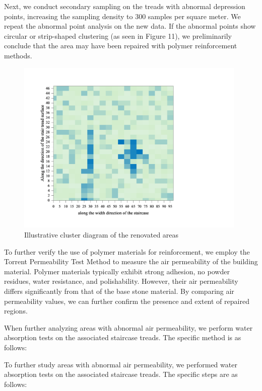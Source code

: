 \documentclass{mcmthesis}
\begin{document}
Next, we conduct secondary sampling on the treads with abnormal depression points, increasing the sampling density to 300 samples per square meter. We repeat the abnormal point analysis on the new data. If the abnormal points show circular or strip-shaped clustering (as seen in Figure 11), we preliminarily conclude that the area may have been repaired with polymer reinforcement methods.
\begin{figure}[h]  %
  \small
  \centering  %
  \includegraphics[width=11cm]{13-Illustrative cluster diagram of the renovated areas.png}
  \caption{Illustrative cluster diagram of the renovated areas} \label{fig:2}  %
  \end{figure}  %



To further verify the use of polymer materials for reinforcement, we employ the Torrent Permeability Test Method to measure the air permeability of the building material\cite{sena2015non}. Polymer materials typically exhibit strong adhesion, no powder residues, water resistance, and polishability. However, their air permeability differs significantly from that of the base stone material. By comparing air permeability values, we can further confirm the presence and extent of repaired regions.

When further analyzing areas with abnormal air permeability, we perform water absorption tests on the associated staircase treads. The specific method is as follows:

To further study areas with abnormal air permeability, we performed water absorption tests on the associated staircase treads. The specific steps are as follows:
\end{document}
